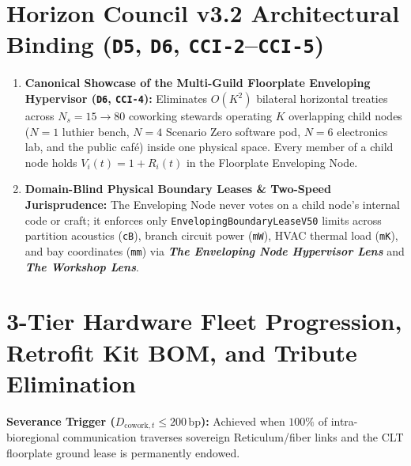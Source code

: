 \section{Horizon Council v3.2 Architectural Binding (\texttt{D5}, \texttt{D6}, \texttt{CCI-2}--\texttt{CCI-5})}
\begin{enumerate}
    \item \textbf{Canonical Showcase of the Multi-Guild Floorplate Enveloping Hypervisor (\texttt{D6}, \texttt{CCI-4}):} Eliminates $O(K^2)$ bilateral horizontal treaties across $N_s = 15 \to 80$ coworking stewards operating $K$ overlapping child nodes ($N=1$ luthier bench, $N=4$ Scenario Zero software pod, $N=6$ electronics lab, and the public café) inside one physical space. Every member of a child node holds $V_i(t) = 1 + R_i(t)$ in the Floorplate Enveloping Node.
    \item \textbf{Domain-Blind Physical Boundary Leases \& Two-Speed Jurisprudence:} The Enveloping Node never votes on a child node's internal code or craft; it enforces only \texttt{EnvelopingBoundaryLeaseV50} limits across partition acoustics (\texttt{cB}), branch circuit power (\texttt{mW}), HVAC thermal load (\texttt{mK}), and bay coordinates (\texttt{mm}) via \textbf{\textit{The Enveloping Node Hypervisor Lens}} and \textbf{\textit{The Workshop Lens}}.
\end{enumerate}

\section{3-Tier Hardware Fleet Progression, Retrofit Kit BOM, and Tribute Elimination}
\begin{table}[htbp]
\centering
\caption{Scenario Epsilon (\texttt{SCN-EPSILON-COWORKING}) Hardware Fleet Progression and Fiat Tribute Elimination Curve}
\label{tab:app05-epsilon-hardware}
\small
{}
\end{table}

\textbf{Severance Trigger ($D_{\mathrm{cowork},t} \le 200\,\mathrm{bp}$):} Achieved when $100\%$ of intra-bioregional communication traverses sovereign Reticulum/fiber links and the CLT floorplate ground lease is permanently endowed.
